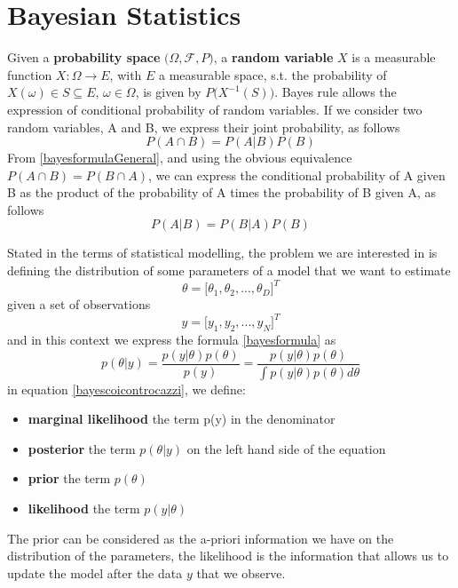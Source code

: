\documentclass[12pt,mythesisstyle]{report}
\begin{document}
\section{Bayesian Statistics}\label{section:bayesIntro}
Given a \textbf{probability space} $\big(\Omega, \mathcal{F}, P\big)$, a \textbf{random variable} $X$ is a measurable function $X: \Omega \rightarrow E$, with $E$ a measurable space, s.t. the probability of $X(\omega) \in S \subseteq E\text{, }\omega \in \Omega $, is given by $P\big(X^{-1}(S)\big)$. Bayes rule allows the expression of conditional probability of random variables. If we consider two random variables, A and B, we express their joint probability, as follows
\begin{equation}\label{bayesformulaGeneral}
P(A\cap B)=P(A|B)P(B)
\end{equation}
From \eqref{bayesformulaGeneral}, and using the obvious equivalence $P(A\cap B)=P(B\cap A)$, we can express the conditional probability of A given B as the product of the probability of A times the probability of B given A, as follows
\begin{equation}\label{bayesformula}
P(A|B)=P(B|A)P(B)
\end{equation}

Stated in the terms of statistical modelling, the problem we are interested in is defining the distribution of some parameters of a model that we want to estimate
\begin{equation}\label{thetaparam}
\theta=\big[\theta_1, \theta_2,...,\theta_D\big]^T
\end{equation}
given a set of observations 
\begin{equation}\label{yobservation}
y=\big[y_1, y_2,...,y_N\big]^T
\end{equation}
and in this context we express the formula \eqref{bayesformula} as
\begin{equation}\label{bayescoicontrocazzi}
p(\theta | y)=\frac{p(y|\theta)p(\theta)}{p(y)}=\frac{p(y|\theta)p(\theta)}{\int p(y|\theta)p(\theta)d\theta}
\end{equation}
in equation \eqref{bayescoicontrocazzi}, we define:
\begin{itemize}
	\item \textbf{marginal likelihood} the term p(y) in the denominator
	\item \textbf{posterior} the term $p(\theta | y)$ on the left hand side of the equation
	\item \textbf{prior} the term $p(\theta)$
	\item \textbf{likelihood} the term $p(y|\theta)$
\end{itemize}
The prior can be considered as the a-priori information we have on the distribution of the parameters, the likelihood is the information that allows us to update the model after the data $y$ that we observe.
\end{document}
